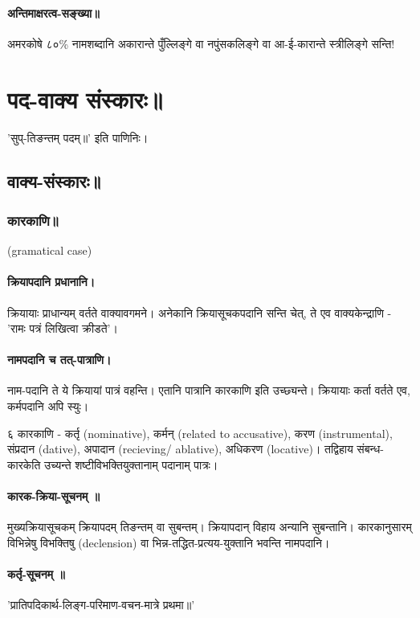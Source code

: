 \documentclass[oneside, article]{memoir}
\begin{document}
\subsection{अन्तिमाक्षरत्व-सङ्ख्या॥}
अमरकोषे ८०\% नामशब्दानि अकारान्ते पुँल्लिङ्गे वा‌ नपुंसकलिङ्गे वा आ-ई-कारान्ते स्त्रीलिङ्गे सन्ति!



\part{पद-वाक्य संस्कारः॥}
'सुप्-तिङन्तम् पदम्॥' इति पाणिनिः।

\chapter{वाक्य-संस्कारः॥}
\section{कारकाणि॥}
(gramatical case)

\subsection{क्रियापदानि प्रधानानि।}
क्रियायाः‌ प्राधान्यम् वर्तते वाक्यावगमने। अनेकानि क्रियासूचकपदानि सन्ति चेत्, ते एव वाक्यकेन्द्राणि - 'रामः पत्रं लिखित्वा क्रीडते'।

\subsection{नामपदानि च तत्-पात्राणि।}
नाम-पदानि ते ये क्रियायां पात्रं वहन्ति। एतानि पात्रानि कारकाणि इति उच्छ्यन्ते। क्रियायाः कर्ता वर्तते एव, कर्मपदानि अपि स्युः।

६ कारकाणि - कर्तृ (nominative), कर्मन् (related to accusative), करण (instrumental), संप्रदान (dative), अपादान (recieving/ ablative), अधिकरण (locative)। तद्विहाय संबन्ध-कारकेति उच्यन्ते शष्टीविभक्तियुक्तानाम् पदानाम् पात्रः।

\subsection{कारक-क्रिया-सूचनम् ॥}
मुख्यक्रियासूचकम् क्रियापदम् तिङन्तम् वा सुबन्तम्। क्रियापदान् विहाय अन्यानि सुबन्तानि।  कारकानुसारम् विभिन्नेषु विभक्तिषु (declension) वा भिन्न-तद्धित-प्रत्यय-युक्तानि भवन्ति नामपदानि।

\subsection{कर्तृ-सूचनम् ॥}
'प्रातिपदिकार्थ-लिङ्ग-परिमाण-वचन-मात्रे प्रथमा॥'
\end{document}
